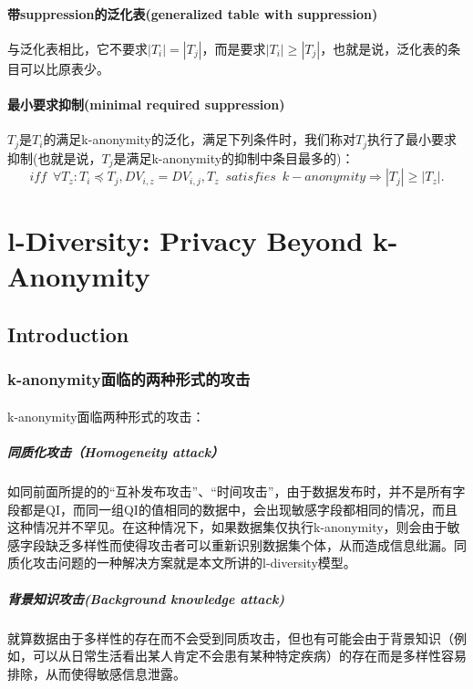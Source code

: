 \documentclass[12pt,a4paper]{article}
\begin{document}
\paragraph{带suppression的泛化表(generalized table with suppression)} 与泛化表相比，它不要求$|T_i| = |T_j|$，而是要求$|T_i| \geq |T_j|$，也就是说，泛化表的条目可以比原表少。

\paragraph{最小要求抑制(minimal required suppression)} $T_j$是$T_i$的满足k-anonymity的泛化，满足下列条件时，我们称对$T_j$执行了最小要求抑制(也就是说，$T_j$是满足k-anonymity的抑制中条目最多的)：
\begin{equation}
	iff \enspace \forall T_z: T_i \preceq T_j, DV_{i,z} = DV_{i,j}, T_z \enspace satisfies \enspace k-anonymity \Rightarrow |T_j| \geq |T_z|.
\end{equation}

























\section{l-Diversity: Privacy Beyond k-Anonymity\cite{l-diversity} }

\subsection{Introduction}
\subsubsection{k-anonymity面临的两种形式的攻击}
\paragraph{} k-anonymity面临两种形式的攻击：
	\subparagraph{同质化攻击（Homogeneity attack）} 如同前面所提的的“互补发布攻击”、“时间攻击”，由于数据发布时，并不是所有字段都是QI，而同一组QI的值相同的数据中，会出现敏感字段都相同的情况，而且这种情况并不罕见。在这种情况下，如果数据集仅执行k-anonymity，则会由于敏感字段缺乏多样性而使得攻击者可以重新识别数据集个体，从而造成信息纰漏。同质化攻击问题的一种解决方案就是本文所讲的l-diversity模型。
	\subparagraph{背景知识攻击(Background knowledge attack)} 就算数据由于多样性的存在而不会受到同质攻击，但也有可能会由于背景知识（例如，可以从日常生活看出某人肯定不会患有某种特定疾病）的存在而是多样性容易排除，从而使得敏感信息泄露。
	
\end{document}
